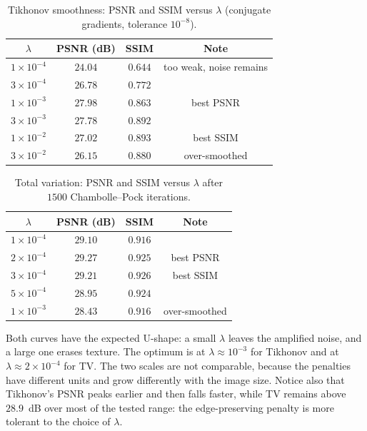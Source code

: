 \documentclass[11pt,a4paper]{article}
\begin{document}
\begin{table}[H]
\centering
\small
\begin{tabular}{cccc}
\toprule
$\lambda$ & PSNR (dB) & SSIM & Note\\
\midrule
$1\times10^{-4}$ & $24.04$ & $0.644$ & too weak, noise remains\\
$3\times10^{-4}$ & $26.78$ & $0.772$ & \\
$1\times10^{-3}$ & $\mathbf{27.98}$ & $0.863$ & best PSNR\\
$3\times10^{-3}$ & $27.78$ & $0.892$ & \\
$1\times10^{-2}$ & $27.02$ & $\mathbf{0.893}$ & best SSIM\\
$3\times10^{-2}$ & $26.15$ & $0.880$ & over-smoothed\\
\bottomrule
\end{tabular}
\caption{Tikhonov smoothness: PSNR and SSIM versus $\lambda$ (conjugate gradients, tolerance
$10^{-8}$).}
\label{tab:tikhonov}
\end{table}

\begin{table}[H]
\centering
\small
\begin{tabular}{cccc}
\toprule
$\lambda$ & PSNR (dB) & SSIM & Note\\
\midrule
$1\times10^{-4}$ & $29.10$ & $0.916$ & \\
$2\times10^{-4}$ & $\mathbf{29.27}$ & $0.925$ & best PSNR\\
$3\times10^{-4}$ & $29.21$ & $\mathbf{0.926}$ & best SSIM\\
$5\times10^{-4}$ & $28.95$ & $0.924$ & \\
$1\times10^{-3}$ & $28.43$ & $0.916$ & over-smoothed\\
\bottomrule
\end{tabular}
\caption{Total variation: PSNR and SSIM versus $\lambda$ after $1500$ Chambolle--Pock iterations.}
\label{tab:tv}
\end{table}

Both curves have the expected U-shape: a small $\lambda$ leaves the amplified noise, and a large
one erases texture. The optimum is at $\lambda\approx10^{-3}$ for Tikhonov and at
$\lambda\approx2\times10^{-4}$ for TV. The two scales are not comparable, because the penalties
have different units and grow differently with the image size. Notice also that Tikhonov's PSNR
peaks earlier and then falls faster, while TV remains above $28.9$~dB over most of the tested
range: the edge-preserving penalty is more tolerant to the choice of $\lambda$.
\end{document}
